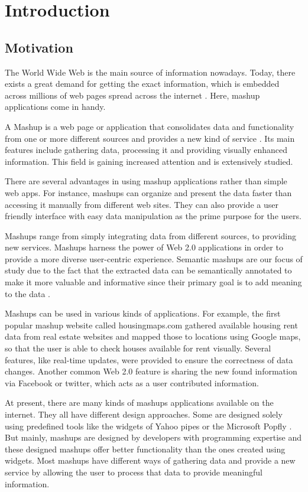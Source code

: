 \chapter{Introduction}
\section{Motivation}
    The World Wide Web is the main source of information nowadays. Today, there exists a great demand for getting the exact information, which is embedded across millions of web pages spread across the internet \cite{1}. Here, mashup applications come in handy.
     
A Mashup is a web page or application that consolidates data and functionality from one or more different sources and provides a new kind of service \cite{2}. Its main features include gathering data, processing it and providing visually enhanced information. This field is gaining increased attention and is extensively studied.

There are several advantages in using mashup applications rather than simple web apps. For instance, mashups can organize and present the data faster than accessing it manually from different web sites. They can also provide a user friendly interface with easy data manipulation as the prime purpose for the users.

Mashups range from simply integrating data from different sources, to providing new services. Mashups harness the power of Web 2.0 applications in order to provide a more diverse user-centric experience. Semantic mashups are our focus of study due to the fact that the extracted data can be semantically annotated to make it more valuable and informative since their primary goal is to add meaning to the data \cite{1}.

Mashups can be used in various kinds of applications. For example, the first popular mashup website called housingmaps.com gathered available housing rent data from real estate websites and mapped those to locations using Google maps, so that the user is able to check houses available for rent visually. Several features, like real-time updates, were provided to ensure the correctness of data changes. Another common Web 2.0 feature is sharing the new found information via Facebook or twitter, which acts as a user contributed information.

At present, there are many kinds of mashups applications available on the internet. They all have different design approaches. Some are designed solely using predefined tools like the widgets of Yahoo pipes \cite{25} or the Microsoft Popfly \cite{26}. But mainly, mashups are designed by developers with programming expertise and these designed mashups offer better functionality than the ones created using widgets. Most mashups have different ways of gathering data and provide a new service by allowing the user to process that data to provide meaningful information.

